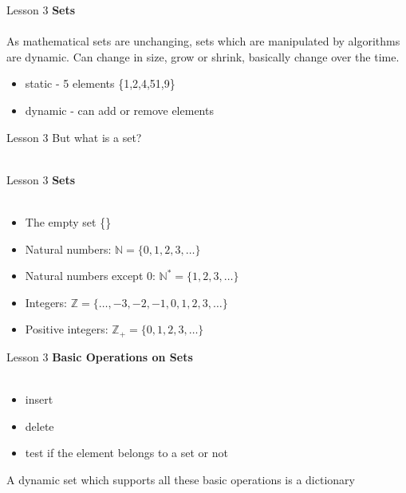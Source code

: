 \documentclass[aspectratio=1610]{beamer}
\begin{document}
\begin{frame}{Lesson 3}{}
\LARGE
\textbf{Sets}\\~\\
As mathematical sets are unchanging, sets which are manipulated by algorithms are dynamic. Can change in size, grow or shrink, basically change over the time. 

\begin{itemize}
    \item static - 5 elements \{1,2,4,51,9\}
    \item dynamic - can add or remove elements
\end{itemize}

\end{frame}



\begin{frame}{Lesson 3}{}
\Huge{But what is a set?}\\~\\
\end{frame}


\begin{frame}{Lesson 3}{}
\LARGE
\textbf{Sets}\\~\\
\begin{itemize}
    \item The empty set \{\}
    \item Natural numbers: $\mathbb{N} = \{0, 1, 2, 3, \ldots\}$
    \item Natural numbers except 0: $\mathbb{N^*} = \{1, 2, 3, \ldots\}$
    \item Integers: $\mathbb{Z} = \{\ldots, -3, -2, -1, 0, 1, 2, 3, \ldots\}$
    \item Positive integers: $\mathbb{Z_+} = \{0, 1, 2, 3, \ldots\}$
\end{itemize}
\end{frame}


\begin{frame}{Lesson 3}{}
\LARGE
\textbf{Basic Operations on Sets}\\~\\
\begin{itemize}
    \item insert
    \item delete
    \item test if the element belongs to a set or not 
\end{itemize}

A dynamic set which supports all these basic operations is a dictionary
\end{frame}
\end{document}
